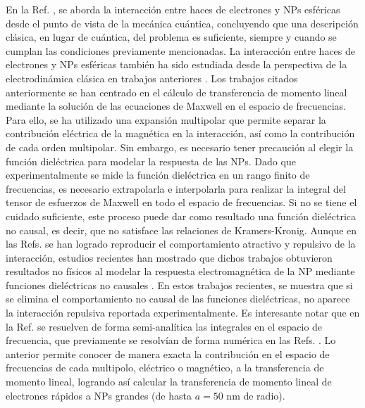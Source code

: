 En la Ref. \cite{deabajo2021optical}, se aborda la interacción entre haces de electrones y NPs esféricas desde el punto de vista de la mecánica cuántica, concluyendo que una descripción clásica, en lugar de cuántica, del problema es suficiente, siempre y cuando se cumplan las condiciones previamente mencionadas. La interacción entre haces de electrones y NPs esféricas también ha sido estudiada desde la perspectiva de la electrodinámica clásica en trabajos anteriores \cite{GarciadeAbajo0, PRBCoronado, Lagos2, Batson2, xu2010transmission}. Los trabajos citados anteriormente se han centrado en el cálculo de transferencia de momento lineal mediante la solución de las ecuaciones de Maxwell en el espacio de frecuencias. Para ello, se ha utilizado una expansión multipolar que permite separar la contribución eléctrica de la magnética en la interacción, así como la contribución de cada orden multipolar. Sin embargo, es necesario tener precaución al elegir la función dieléctrica para modelar la respuesta de las NPs. Dado que experimentalmente se mide la función dieléctrica en un rango finito de frecuencias, es necesario extrapolarla e interpolarla para realizar la integral del tensor de esfuerzos de Maxwell en todo el espacio de frecuencias. Si no se tiene el cuidado suficiente, este proceso puede dar como resultado una función dieléctrica no causal, es decir, que no satisface las relaciones de Kramers-Kronig. Aunque en las Refs. \cite{GarciadeAbajo0, PRBCoronado, Lagos2, Batson2, xu2010transmission} se han logrado reproducir el comportamiento atractivo y repulsivo de la interacción, estudios recientes han mostrado que dichos trabajos obtuvieron resultados no físicos al modelar la respuesta electromagnética de la NP mediante funciones dieléctricas no causales \cite{castrejon2021effects, castrejon2021phdthesis}. En estos trabajos recientes, se muestra que si se elimina el comportamiento no causal de las funciones dieléctricas, no aparece la interacción repulsiva reportada experimentalmente. Es interesante notar que en la Ref. \cite{castrejon2021phdthesis} se resuelven de forma semi-analítica las integrales en el espacio de frecuencia, que previamente se resolvían de forma numérica en las Refs. \cite{GarciadeAbajo0, PRBCoronado, Lagos2, Batson2, xu2010transmission}. Lo anterior permite conocer de manera exacta la contribución en el espacio de frecuencias de cada multipolo, eléctrico o magnético, a la transferencia de momento lineal, logrando así calcular la transferencia de momento lineal de electrones rápidos a NPs grandes (de hasta $a=50$ nm de radio).


